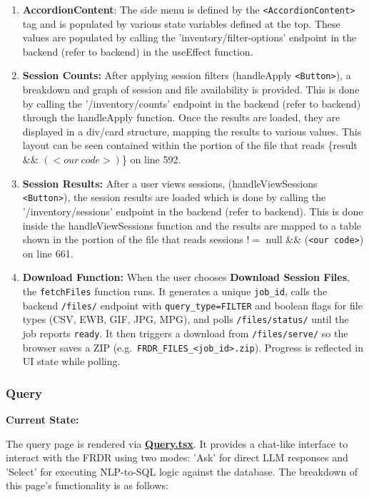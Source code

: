 \documentclass{article}
\begin{document}
\begin{enumerate}

  \item{\textbf{AccordionContent}: The side menu is defined by the \texttt{<AccordionContent>} tag and is populated by various state variables defined at the top.
  These values are populated by calling the 'inventory/filter-options' endpoint in the backend (refer to backend) in the useEffect function.}
  \item{\textbf{Session Counts:} After applying session filters (handleApply \texttt{<Button>}), a breakdown and graph of session and file availability is provided.
  This is done by calling the '/inventory/counts' endpoint in the backend (refer to backend) through the handleApply function. Once the results are loaded,
  they are displayed in a div/card structure, mapping the results to various values. This layout can be seen contained within the portion of the file that
  reads \{result \&\& $(<our~code>)$\} on line 592.}
  \item{\textbf{Session Results:} After a user views sessions, (handleViewSessions \texttt{<Button>}), the session results are loaded which is done by
  calling the '/inventory/sessions' endpoint in the backend (refer to backend). This is done inside the handleViewSessions function and the results
  are mapped to a table shown in the portion of the file that reads sessions $!=$ null \&\& (\texttt{<our code>}) on line 661.}
  \item{\textbf{Download Function:} When the user chooses \textbf{Download Session Files}, the \texttt{fetchFiles} function runs. It generates a unique \texttt{job\_id}, calls the backend \texttt{/files/} endpoint with \texttt{query\_type=FILTER} and boolean flags for file types (CSV, EWB, GIF, JPG, MPG), and polls \texttt{/files/status/} until the job reports \texttt{ready}. It then triggers a download from \texttt{/files/serve/} so the browser saves a ZIP (e.g.\ \texttt{FRDR\_FILES\_<job\_id>.zip}). Progress is reflected in UI state while polling.}

\end{enumerate}

\subsubsection{Query}

\par{\textbf{Current State:}}
\par{The query page is rendered via \href{https://github.com/OCD-Rats-Capstone/OCD-Rat-Infrastructure/blob/main/src/ocd-rat-frontend/src/pages/Query.tsx}{\textbf{Query.tsx}}. It provides a chat-like interface to interact with the FRDR using two modes: 'Ask' for direct LLM responses and 'Select' for executing NLP-to-SQL logic against the database. The breakdown of this page's functionality is as follows:}
\end{document}
